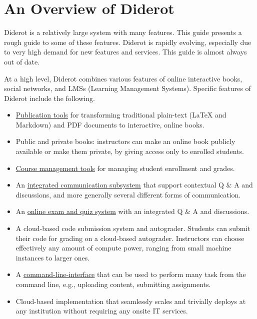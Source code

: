 \chapter{An Overview of Diderot}
\label{ch:overview}

\begin{gram}
\label{ch:overview::intro}
Diderot is a relatively large system with many features. This guide presents a rough guide to some of these features.  Diderot is rapidly evolving, especially due to very high demand for new features and services. This guide is almost always out of date.
\end{gram}

\begin{gram}
\label{ch:overview::features}
At a high level, Diderot combines various features of online interactive books,  social networks, and LMSs (Learning Management Systems).
% 
Specific features of Diderot include the following.

\begin{itemize}

\item  
\href{ch:dc}{Publication tools} 
%
for transforming traditional plain-text (LaTeX and Markdown) and PDF documents to interactive, online books. 

\item 
Public and private books: instructors can make an online book publicly
available or make them private, by giving access only to enrolled
students.

 
\item \href{ch:lms}{Course management tools} for managing student enrollment and grades.

\item An \href{ch:posts}{integrated communication subsystem} that support contextual Q
  \& A and discussions, and more generally several different forms of
  communication.
  
\item An \href{ch:quiz}{online exam and quiz system} with an integrated Q \& A and discussions.  

\item A cloud-based code submission system and autograder. Students
  can submit their code for grading on a cloud-based
  autograder. Instructors can choose effectively any amount of compute
  power, ranging from small machine instances to larger ones.

\item A \href{ch:cli}{command-line-interface} that can be used to
  perform many task from the command line, e.g., uploading content,
  submitting assignments.

\item
  Cloud-based implementation that seamlessly scales and trivially
  deploys at any institution without requiring any onsite IT services.
\end{itemize}
\end{gram}
